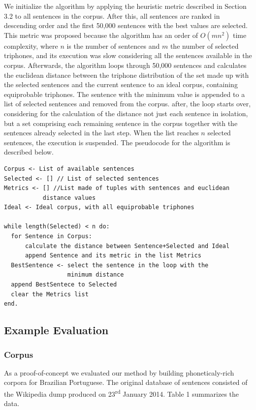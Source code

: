 We initialize the algorithm by applying the heuristic metric described in Section 3.2 to all sentences in the 
corpus. After this, all sentences are ranked in descending order and the first 50,000 sentences with 
the best values are selected. This metric was proposed because the algorithm has an order of $O(mn^2)$ time complexity, 
where $n$ is the number of sentences and $m$ the number of selected triphones, and its execution was slow considering
all the sentences available in the corpus. Afterwards, the algorithm loops through 50,000 sentences and calculates 
the euclidean distance between the triphone distribution of the set made up with the selected sentences and the current sentence to an ideal corpus, containing equiprobable triphones. The sentence with the minimum value is appended to a list 
of selected sentences and removed from the corpus. after, the loop starts over, considering for the 
calculation of the distance not just each sentence in isolation, but a set comprising each remaining 
sentence in the corpus together with the sentences already selected in the last step. When the list reaches 
$n$ selected sentences, the execution is suspended. The pseudocode for the algorithm is described below.

\noindent
\begin{verbatim}
Corpus <- List of available sentences
Selected <- [] // List of selected sentences
Metrics <- [] //List made of tuples with sentences and euclidean 
           distance values
Ideal <- Ideal corpus, with all equiprobable triphones

while length(Selected) < n do:
  for Sentence in Corpus:
      calculate the distance between Sentence+Selected and Ideal
      append Sentence and its metric in the list Metrics
  BestSentence <- select the sentence in the loop with the
                  minimum distance
  append BestSentece to Selected
  clear the Metrics list
end.
\end{verbatim}
%
\noindent


\subsection{Example Evaluation}
\subsubsection{Corpus}

As a proof-of-concept we evaluated our method by building phoneticaly-rich corpora for Brazilian Portuguese. The original 
database of sentences consisted of the Wikipedia dump produced on 23\textsuperscript{rd} January 2014.
Table 1 summarizes the data.


